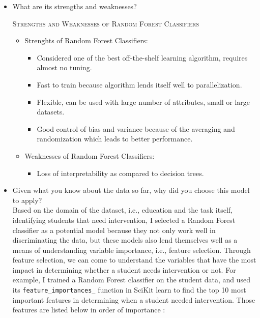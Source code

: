 \documentclass[twoside,openright,titlepage,numbers=noenddot,headinclude,%
               footinclude=true,cleardoublepage=empty,abstractoff,BCOR=5mm,%
               paper=a4,fontsize=11pt,ngerman,american]{scrreprt}
\numberwithin{theorem}{chapter}
\numberwithin{definition}{chapter}
\numberwithin{algorithm}{chapter}
\numberwithin{figure}{chapter}
\numberwithin{table}{chapter}
\numberwithin{equation}{chapter}
\newenvironment{remark}[1]{%
  \definecolor{shadecolor}{gray}{0.9}%
  \begin{shaded}{\color{Maroon}\noindent\textsc{#1}}\\%
}{%
  \end{shaded}%
}
\begin{document}
\begin{itemize}
\item What are its strengths and weaknesses?\\
\begin{remark}{Strengths and Weaknesses of Random Forest Classifiers}
  \begin{itemize} 
       \item Strenghts of Random Forest Classifiers:
              \begin{itemize} 
                     \item Considered one of the best off-the-shelf learning algorithm, requires almost no tuning. 
                     \item Fast to train because algorithm lends itself well to parallelization.
                     \item Flexible, can be used with large number of attributes, small or large datasets.
                     \item Good control of bias and variance because of the averaging and randomization which leads to better performance.
              \end{itemize}
       \item Weaknesses of Random Forest Classifiers:
              \begin{itemize} 
                     \item Loss of interpretability as compared to decision trees.
              \end{itemize}
       \end{itemize}
  \end{remark}


\item Given what you know about the data so far, why did you choose this model to apply?\\
Based on the domain of the dataset, i.e., education and the task itself, identifying students that need intervention, I selected a Random Forest classifier as a potential model because they not only work well in discriminating the data, but these models also lend themselves well as a means of understanding variable importance, i.e., feature selection. Through feature selection, we can come to understand the variables that have the most impact in determining whether a student needs intervention or not.
For example, I trained a Random Forest classifier on the student data, and used its \texttt{feature\_importances\_} function in SciKit learn to find the top 10 most important features in determining when a student needed intervention. Those features are listed below in order of importance : 


\end{itemize}
\end{document}
